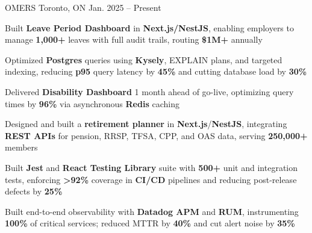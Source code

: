 \documentclass[11pt, a4paper]{awesome-cv}
\begin{document}
\makecvheader[C]


\begin{cventries}


  \cventry
    {\color{lightblue}{ASSOCIATE FULL-STACK ENGINEER}}
    {OMERS}
    {Toronto, ON}
    {Jan. 2025 -- Present}
    {
      \begin{cvitems}
        \item{Built \textbf{Leave Period Dashboard} in \textbf{Next.js/NestJS}, enabling employers to manage \textbf{1,000+} leaves with full audit trails, routing \textbf{\$1M+} annually}
        \item{Optimized \textbf{Postgres} queries using \textbf{Kysely}, EXPLAIN plans, and targeted indexing, reducing \textbf{p95} query latency by \textbf{45\%} and cutting database load by \textbf{30\%}}
        \item{Delivered \textbf{Disability Dashboard} 1 month ahead of go-live, optimizing query times by \textbf{96\%} via asynchronous \textbf{Redis} caching}
        \item{Designed and built a \textbf{retirement planner} in \textbf{Next.js}/\textbf{NestJS}, integrating \textbf{REST APIs} for pension, RRSP, TFSA, CPP, and OAS data, serving \textbf{250,000+} members}
        \item{Built \textbf{Jest} and \textbf{React Testing Library} suite with \textbf{500+} unit and integration tests, enforcing \textbf{>92\%} coverage in \textbf{CI/CD} pipelines and reducing post-release defects by \textbf{25\%}}
        \item{Built end-to-end observability with \textbf{Datadog APM} and \textbf{RUM}, instrumenting \textbf{100\%} of critical services; reduced MTTR by \textbf{40\%} and cut alert noise by \textbf{35\%}}
      \end{cvitems}
    }


\end{cventries}
\end{document}

